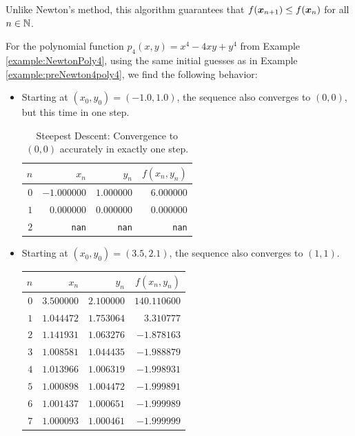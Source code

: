 \begin{remark}
Unlike Newton's method, this algorithm guarantees that $f(\boldsymbol{x}_{n+1}) \leq f(\boldsymbol{x}_n)$ for all $n \in \mathbb{N}$.
\end{remark}

\begin{example}
For the polynomial function $p_4(x,y) = x^4-4xy+y^4$ from Example \ref{example:NewtonPoly4}, using the same initial guesses as in Example \ref{example:preNewton4poly4}, we find the following behavior:
\begin{itemize}
	\item Starting at $(x_0, y_0) = (-1.0,1.0)$, the sequence also converges to $(0,0)$, but this time in one step.
	\begin{table}[ht!]
	\begin{tabular}{|r|r|r|r|} \hline 
	$n$ & $x_n$ & $y_n$ & $f(x_n,y_n)$ \\ \hline \hline 
	$0$ & $-1.000000$ & $1.000000$ & $6.000000$ \\ \hline 
	$1$ & $0.000000$ & $0.000000$ & $0.000000$ \\ \hline 
	$2$ & \texttt{nan} & \texttt{nan} & \texttt{nan} \\ \hline 
	\end{tabular}
	\caption{Steepest Descent: Convergence to $(0,0)$ accurately in exactly one step.}
	\label{table:SD00}
	\end{table}
	\item Starting at $(x_0,y_0) = (3.5, 2.1)$, the sequence also converges to $(1,1)$.
	\begin{table}[ht!]
	\begin{tabular}{|r|r|r|r|} \hline 
	$n$ & $x_n$ & $y_n$ & $f(x_n,y_n)$ \\ \hline \hline 
	$0$ & $3.500000$ & $2.100000$ & $140.110600$ \\ \hline 
	$1$ & $1.044472$ & $1.753064$ & $3.310777$ \\ \hline 
	$2$ & $1.141931$ & $1.063276$ & $-1.878163$ \\ \hline 
	$3$ & $1.008581$ & $1.044435$ & $-1.988879$ \\ \hline 
	$4$ & $1.013966$ & $1.006319$ & $-1.998931$ \\ \hline 
	$5$ & $1.000898$ & $1.004472$ & $-1.999891$ \\ \hline 
	$6$ & $1.001437$ & $1.000651$ & $-1.999989$ \\ \hline 
	$7$ & $1.000093$ & $1.000461$ & $-1.999999$ \\ \hline 
	\end{tabular}~\begin{tabular}{|r|r|r|r|} \hline 

\end{tabular}
\end{table}
\end{itemize}
\end{example}
